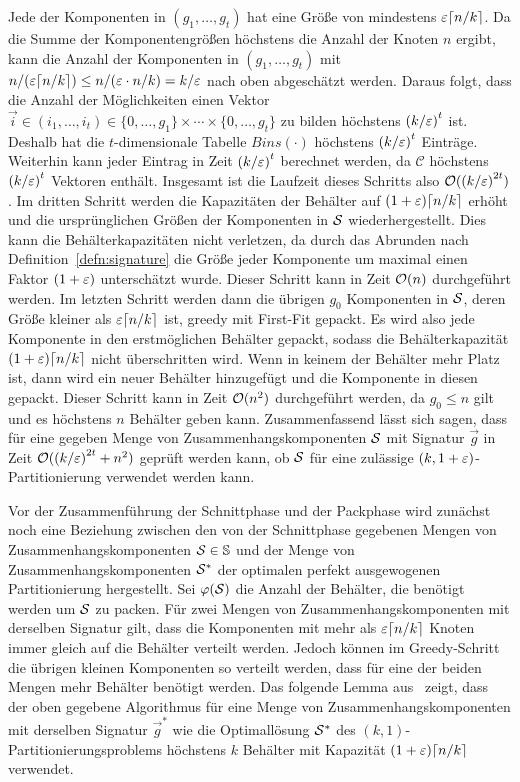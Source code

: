 Jede der Komponenten in $(g_1, \ldots, g_t)$ hat eine Größe von mindestens $\eps \ceil*{n/k}$. 
Da die Summe der Komponentengrößen höchstens die Anzahl der Knoten $n$ ergibt, kann die Anzahl der Komponenten in $(g_1, \ldots, g_t)$ mit $n / (\varepsilon \lceil n/k\rceil) \leq n / (\varepsilon \cdot n/k) = k/\varepsilon$ nach oben abgeschätzt werden.
Daraus folgt, dass die Anzahl der Möglichkeiten einen Vektor $\vec{i} \in (i_1, \ldots, i_t) \in \{0, \ldots, g_1\} \times \cdots \times \{0, \ldots, g_t\}$ zu bilden höchstens ${(k/\varepsilon)}^t$ ist.
Deshalb hat die $t$-dimensionale Tabelle $Bins(\cdot)$ höchstens ${(k/\varepsilon)}^t$ Einträge. 
Weiterhin kann jeder Eintrag in Zeit ${(k/\varepsilon)}^t$ berechnet werden, da $\mathcal{C}$ höchstens ${(k/\varepsilon)}^t$ Vektoren enthält.
Insgesamt ist die Laufzeit dieses Schritts also $\mathcal{O}({(k/\varepsilon)}^{2t})$.
Im dritten Schritt werden die Kapazitäten der Behälter auf $(1 + \eps) \ceil*{n/k}$ erhöht und die ursprünglichen Größen der Komponenten in $\mathcal{S}$ wiederhergestellt.
Dies kann die Behälterkapazitäten nicht verletzen, da durch das Abrunden nach Definition~\ref{defn:signature} die Größe jeder Komponente um maximal einen Faktor $(1 + \varepsilon)$ unterschätzt wurde.
Dieser Schritt kann in Zeit $\mathcal{O}(n)$ durchgeführt werden.
Im letzten Schritt werden dann die übrigen $g_0$ Komponenten in $\mathcal{S}$, deren Größe kleiner als $\eps \ceil*{n/k}$ ist, greedy mit First-Fit gepackt. 
Es wird also jede Komponente in den erstmöglichen Behälter gepackt, sodass die Behälterkapazität $(1 + \eps) \ceil*{n/k}$ nicht überschritten wird.
Wenn in keinem der Behälter mehr Platz ist, dann wird ein neuer Behälter hinzugefügt und die Komponente in diesen gepackt.
Dieser Schritt kann in Zeit $\mathcal{O}(n^2)$ durchgeführt werden, da $g_0 \leq n$ gilt und es höchstens $n$ Behälter geben kann.
Zusammenfassend lässt sich sagen, dass für eine gegeben Menge von Zusammenhangskomponenten $\mathcal{S}$ mit Signatur $\vec{g}$ in Zeit $\mathcal{O}({(k/\varepsilon)}^{2t} + n^2)$ geprüft werden kann, ob $\mathcal{S}$ für eine zulässige $(k, 1 + \varepsilon)$\hyp Partitionierung verwendet werden kann.

Vor der Zusammenführung der Schnittphase und der Packphase wird zunächst noch eine Beziehung zwischen den von der Schnittphase gegebenen Mengen von Zusammenhangskomponenten $\mathcal{S} \in \mathbb{S}$ und der Menge von Zusammenhangskomponenten $\mathcal{S}^*$ der optimalen perfekt ausgewogenen Partitionierung hergestellt.
Sei $\varphi(\mathcal{S})$ die Anzahl der Behälter, die benötigt werden um $\mathcal{S}$ zu packen.
Für zwei Mengen von Zusammenhangskomponenten mit derselben Signatur gilt, dass die Komponenten mit mehr als $\eps \ceil*{n/k}$ Knoten immer gleich auf die Behälter verteilt werden.
Jedoch können im Greedy-Schritt die übrigen kleinen Komponenten so verteilt werden, dass für eine der beiden Mengen mehr Behälter benötigt werden.
Das folgende Lemma aus~\parencite{FF15} zeigt, dass der oben gegebene Algorithmus für eine Menge von Zusammenhangskomponenten mit derselben Signatur $\vec{g}^*$ wie die Optimallösung $\mathcal{S}^*$ des $(k, 1)$\hyp Partitionierungsproblems höchstens $k$ Behälter mit Kapazität $(1 + \eps) \ceil*{n/k}$ verwendet.

